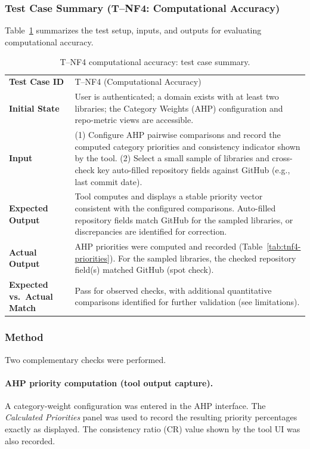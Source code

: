 \documentclass[12pt, titlepage]{article}
\begin{document}
\subsubsection{Test Case Summary (T--NF4: Computational Accuracy)}
Table~\ref{tab:tnf4-summary} summarizes the test setup, inputs, and outputs for evaluating computational accuracy.
\begin{table}[H]
  \centering
  \caption{T--NF4 computational accuracy: test case summary.}
  \label{tab:tnf4-summary}
  \begin{tabular}{@{}p{}p{}@{}}
    \toprule
    \textbf{Test Case ID} &
      T--NF4 (Computational Accuracy) \\
    \textbf{Initial State} &
      User is authenticated; a domain exists with at least two libraries; the
      Category Weights (AHP) configuration and repo-metric views are
      accessible. \\
    \textbf{Input} &
      (1) Configure AHP pairwise comparisons and record the computed category
      priorities and consistency indicator shown by the tool.
      (2) Select a small sample of libraries and cross-check key auto-filled
      repository fields against GitHub (e.g., last commit date). \\
    \textbf{Expected Output} &
      Tool computes and displays a stable priority vector consistent with the
      configured comparisons.  Auto-filled repository fields match GitHub for
      the sampled libraries, or discrepancies are identified for correction. \\
    \textbf{Actual Output} &
      AHP priorities were computed and recorded
      (Table~\ref{tab:tnf4-priorities}).  For the sampled libraries, the
      checked repository field(s) matched GitHub (spot check). \\
    \textbf{Expected vs.\ Actual Match} &
      Pass for observed checks, with additional quantitative comparisons identified for further validation (see limitations). \\
    \bottomrule
  \end{tabular}
\end{table}

\subsubsection{Method}
Two complementary checks were performed.

\paragraph{AHP priority computation (tool output capture).}
A category-weight configuration was entered in the AHP interface.  The
\emph{Calculated Priorities} panel was used to record the resulting priority
percentages exactly as displayed.  The consistency ratio (CR) value shown by
the tool UI was also recorded.
\end{document}
